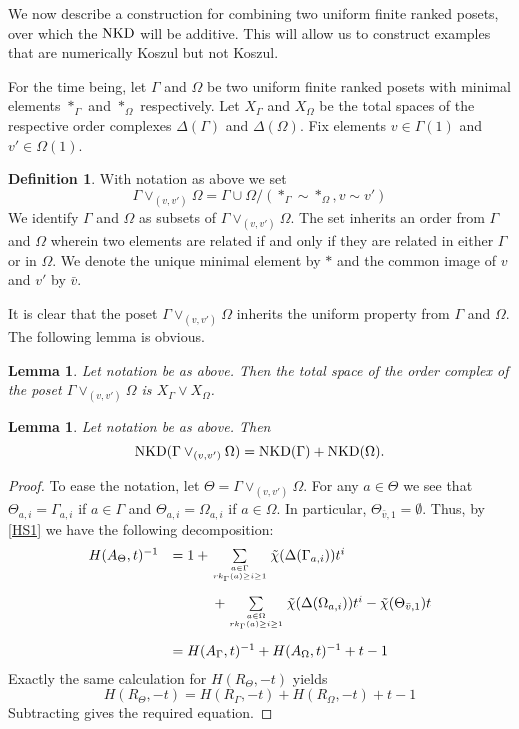 \documentclass[11pt,righttag]{amsart}
\newtheorem{lemma}[thm]{Lemma}
\theoremstyle{definition}
\newtheorem{defn}[thm]{Definition}
\begin{document}
We now describe a construction for combining two uniform finite ranked posets, over which the ${{\rm NKD}}$ will be additive.  
This will allow us to construct examples that are numerically Koszul  but not Koszul.   

For the time being, let $\Gamma$ and $\Omega$ be two uniform finite ranked posets with minimal elements 
$*_\Gamma$ and $*_\Omega$ respectively.   Let $X_\Gamma$ and $X_\Omega$ be the total spaces of the respective order 
complexes $\Delta(\Gamma)$ and $\Delta(\Omega)$.   Fix elements $v\in \Gamma(1)$ and $v'\in \Omega(1)$.

\begin{defn}  With notation as above we set
$$ \Gamma \vee_{(v,v')}\Omega = \Gamma \cup \Omega / ( *_\Gamma \sim *_\Omega, v\sim v')$$
We identify $\Gamma$ and $\Omega$ as subsets of $ \Gamma \vee_{(v,v')}\Omega$.  The set inherits an order from $\Gamma$ and $\Omega$ wherein two elements are related if and only if they are related in either $\Gamma$ or in $\Omega$. We denote the unique minimal element by  $*$ and the common image of $v$ and $v'$ by $\bar v$.  
\end{defn}

It is clear that the poset $ \Gamma \vee_{(v,v')}\Omega$ inherits the uniform property from 
$\Gamma$ and $\Omega$.  The following lemma is obvious. 

\begin{lemma}\label{top}  Let notation be as above.  Then the total space of the order complex of the poset 
$\Gamma\vee_{(v,v')}\Omega$ is $X_\Gamma \vee X_\Omega$.  
\end{lemma}

\begin{lemma}\label{NKD}
Let notation be as above.  Then
$$ {{\rm NKD}}(\Gamma \vee_{(v,v')}\Omega) = {{\rm NKD}}(\Gamma) + {{\rm NKD}}(\Omega).$$
\end{lemma}

\begin{proof}
To ease the notation, let  $\Theta =  \Gamma \vee_{(v,v')}\Omega$.  For any $a\in \Theta$ we see that $\Theta_{a,i} = \Gamma_{a,i}$ if $a\in \Gamma$ and $\Theta_{a,i} = \Omega_{a,i}$ if $a\in \Omega$.  In particular, $\Theta_{\bar v,1} = \emptyset$.  
Thus, by \ref{HS1}  we have the following decomposition:
$$
\begin{array}{lll} 
H(A_\Theta,t)^{-1} &= 1 + \sum\limits_{a\in \Gamma \atop rk_\Gamma(a) \ge i\ge 1} \tilde\chi(\Delta(\Gamma_{a,i})) t^i\\[22pt]
&\qquad\quad + \sum\limits_{a\in \Omega \atop rk_\Gamma(a) \ge i\ge 1} \tilde\chi(\Delta(\Omega_{a,i})) t^i -  \tilde\chi(\Theta_{\bar v,1})t\\[22pt]
&= H(A_\Gamma,t)^{-1} + H(A_\Omega,t)^{-1} + t - 1\\
\end{array}
$$
Exactly the same calculation for $H(R_\Theta,-t)$ yields
$$ H(R_\Theta,-t) = H(R_\Gamma,-t) + H(R_\Omega, -t) + t - 1$$
Subtracting gives the required equation.
\end{proof}
\end{document}
